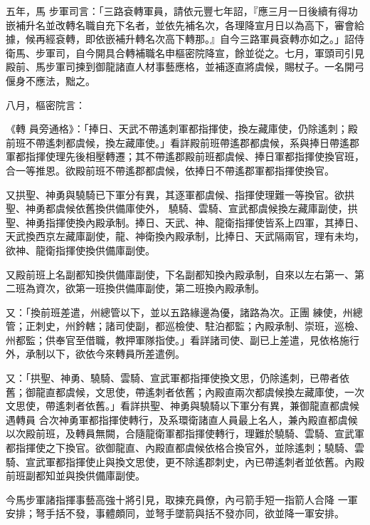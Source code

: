 \begin{pinyinscope}
 五年，馬
 步軍司言：「三路袞轉軍員，請依元豐七年詔，『應三月一日後續有得功嵌補升名並改轉名職自充下名者，並依先補名次，各理降宣月日以為高下，審會給據，候再經袞轉，即依嵌補升轉名次高下轉那。』自今三路軍員袞轉亦如之。」詔侍衛馬、步軍司，自今開具合轉補職名申樞密院降宣，餘並從之。七月，軍頭司引見殿前、馬步軍司揀到御龍諸直人材事藝應格，並補逐直將虞候，賜杖子。一名開弓偃身不應法，黜之。



 八月，樞密院言：



 《轉
 員旁通格》：「捧日、天武不帶遙刺軍都指揮使，換左藏庫使，仍除遙刺；殿前班不帶遙刺都虞候，換左藏庫使。」看詳殿前班帶遙郡都虞候，系與捧日帶遙郡軍都指揮使理先後相壓轉遷；其不帶遙郡殿前班都虞候、捧日軍都指揮使換官班，合一等推恩。欲殿前班不帶遙郡都虞候，依捧日不帶遙郡軍都指揮使換官。



 又拱聖、神勇與驍騎已下軍分有異，其逐軍都虞候、指揮使理難一等換官。欲拱聖、神勇都虞候依舊換供備庫使外，
 驍騎、雲騎、宣武都虞候換左藏庫副使，拱聖、神勇指揮使換內殿承制。捧日、天武、神、龍衛指揮使皆系上四軍，其捧日、天武換西京左藏庫副使，龍、神衛換內殿承制，比捧日、天武隔兩官，理有未均，欲神、龍衛指揮使換供備庫副使。



 又殿前班上名副都知換供備庫副使，下名副都知換內殿承制，自來以左右第一、第二班為資次，欲第一班換供備庫副使，第二班換內殿承制。



 又：「換前班差遣，州總管以下，並以五路緣邊為優，諸路為次。正團
 練使，州總管；正刺史，州鈐轄；諸司使副，都巡檢使、駐泊都監；內殿承制、崇班，巡檢、州都監；供奉官至借職，教押軍隊指使。」看詳諸司使、副已上差遣，見依格施行外，承制以下，欲依今來轉員所差遣例。



 又：「拱聖、神勇、驍騎、雲騎、宣武軍都指揮使換文思，仍除遙刺，已帶者依舊；御龍直都虞候，文思使，帶遙刺者依舊；內殿直兩次都虞候換左藏庫使，一次文思使，帶遙刺者依舊。」看詳拱聖、神勇與驍騎以下軍分有異，兼御龍直都虞候遇轉員
 合次神勇軍都指揮使轉行，及系環衛諸直人員最上名人，兼內殿直都虞候以次殿前班，及轉員無闕，合隨龍衛軍都指揮使轉行，理難於驍騎、雲騎、宣武軍都指揮使之下換官。欲御龍直、內殿直都虞候依格合換官外，並除遙刺；驍騎、雲騎、宣武軍都指揮使止與換文思使，更不除遙郡刺史，內已帶遙刺者並依舊。內殿前班副都知並與換供備庫副使。



 今馬步軍諸指揮事藝高強十將引見，取揀充員僚，內弓箭手短一指箭人合降
 一軍安排；弩手括不發，事體頗同，並弩手墜箭與括不發亦同，欲並降一軍安排。




\end{pinyinscope}
